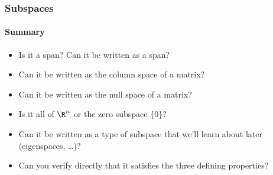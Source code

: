 
\begin{frame}
\frametitle{Subspaces}
\framesubtitle{Summary}

\vskip 5mm

\begin{bluebox}{.9\linewidth}
  \smallskip
  \begin{itemize}
  \item<+-> Is it a span?  Can it be written as a span?
  \item<+-> Can it be written as the column space of a matrix?
  \item<+-> Can it be written as the null space of a matrix?
  \item<+-> Is it all of $\R^n$ or the zero subspace $\{0\}$?
  \item<+-> Can it be written as a type of subspace that we'll learn about later
    (eigenspaces, \ldots)?
  \end{itemize}

  \smallskip{}

  \smallskip{}
  \begin{itemize}
  \item<+-> Can you verify directly that it satisfies the three defining
    properties?
  \end{itemize}
\end{bluebox}

\end{frame}



